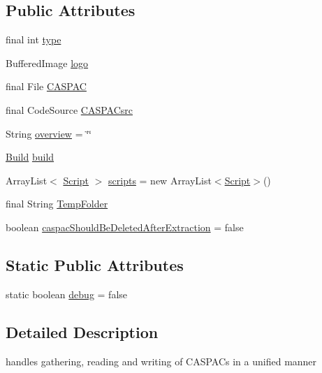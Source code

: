 \subsection*{Public Attributes}
\begin{DoxyCompactItemize}
\item 
final int \hyperlink{class_c_a_s_u_a_l_1_1caspac_1_1_caspac_a1fa7fccdf284c0b71c45004978d8c7d4}{type}
\item 
Buffered\-Image \hyperlink{class_c_a_s_u_a_l_1_1caspac_1_1_caspac_abf626c8f6318968578e79d5afb7f8e6c}{logo}
\item 
final File \hyperlink{class_c_a_s_u_a_l_1_1caspac_1_1_caspac_a6e5addab168b4b657c6b56c85b303775}{C\-A\-S\-P\-A\-C}
\item 
final Code\-Source \hyperlink{class_c_a_s_u_a_l_1_1caspac_1_1_caspac_a708e3c668e09d5901e8e2fdb94aa642a}{C\-A\-S\-P\-A\-Csrc}
\item 
String \hyperlink{class_c_a_s_u_a_l_1_1caspac_1_1_caspac_a351355d1da748e296d36bdf891c1b43f}{overview} = \char`\"{}\char`\"{}
\item 
\hyperlink{class_c_a_s_u_a_l_1_1caspac_1_1_caspac_1_1_build}{Build} \hyperlink{class_c_a_s_u_a_l_1_1caspac_1_1_caspac_ace7ae4866f3cd239e653518559bd0eb1}{build}
\item 
Array\-List$<$ \hyperlink{class_c_a_s_u_a_l_1_1caspac_1_1_script}{Script} $>$ \hyperlink{class_c_a_s_u_a_l_1_1caspac_1_1_caspac_a6e7495da998addcff9ffca07f369ccae}{scripts} = new Array\-List$<$\hyperlink{class_c_a_s_u_a_l_1_1caspac_1_1_script}{Script}$>$()
\item 
final String \hyperlink{class_c_a_s_u_a_l_1_1caspac_1_1_caspac_afb6992f335be11e10621da46afb23459}{Temp\-Folder}
\item 
boolean \hyperlink{class_c_a_s_u_a_l_1_1caspac_1_1_caspac_a2c6cceeb53d5c07779badc9260b8233d}{caspac\-Should\-Be\-Deleted\-After\-Extraction} = false
\end{DoxyCompactItemize}
\subsection*{Static Public Attributes}
\begin{DoxyCompactItemize}
\item 
static boolean \hyperlink{class_c_a_s_u_a_l_1_1caspac_1_1_caspac_aa68f7e8ae529dc2f581b4752f7d11830}{debug} = false
\end{DoxyCompactItemize}


\subsection{Detailed Description}
handles gathering, reading and writing of C\-A\-S\-P\-A\-Cs in a unified manner

